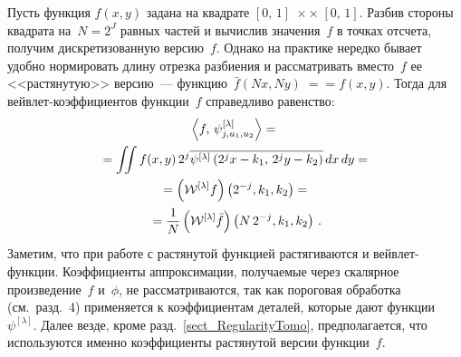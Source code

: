 \begin{multicols}{2}
Пусть функция $f(x,y)$ задана на квадрате $[0,\,1]\;\times$\linebreak $\times\;[0,\,1]$. Разбив стороны квадрата на~$N=2^J$ 
равных частей и вычислив значения~$f$ в точках отсчета, получим дискретизованную версию~$f$. Одна\-ко на практике 
нередко бывает удобно нормировать длину отрезка разбиения и рас\-сматривать вместо~$f$ ее <<растянутую>>
версию~--- функцию~$\bar f(Nx,Ny)\;=$\linebreak $={f}(x,y)$. Тогда для вейвлет-коэффициентов функции~$f$ справедливо равенство:
\begin{multline}
\left\langle f,\, \psi^{[\lambda]}_{j,u_1,u_2}\right\rangle ={}\\
{}= \iint f(x,y)\,2^j\overline{\psi^{[\lambda]}\left(2^jx-k_1,\,2^jy-k_2\right)}\,dx\,dy ={}\\
{}=\left(\mathcal{W}^{[\lambda]}f\right)\left(2^{-j},k_1,k_2\right)={}\\
{}=\displaystyle\frac{\displaystyle 1\mathstrut}{\displaystyle N\mathstrut}\left(\mathcal{W}^{[\lambda]}\bar f\right)\left(N\,2^{-j},k_1,k_2\right)\,.
\label{eq_contToDiscrCoeff}
\end{multline}
Заметим, что при работе с растянутой функцией растягиваются и вейвлет-функции.
Коэффициенты аппроксимации, получаемые через скалярное произведение~$f$ и~$\phi$, не рассматриваются, 
так как пороговая обработка (см.\ разд.~4) применяется к коэффициентам деталей, которые дают функции~$\psi^{[\lambda]}$. 
Далее везде, кроме разд.~\ref{sect_RegularityTomo}, предполагается, что используются именно коэффициенты 
растянутой версии функции~$f$.


\end{multicols}
